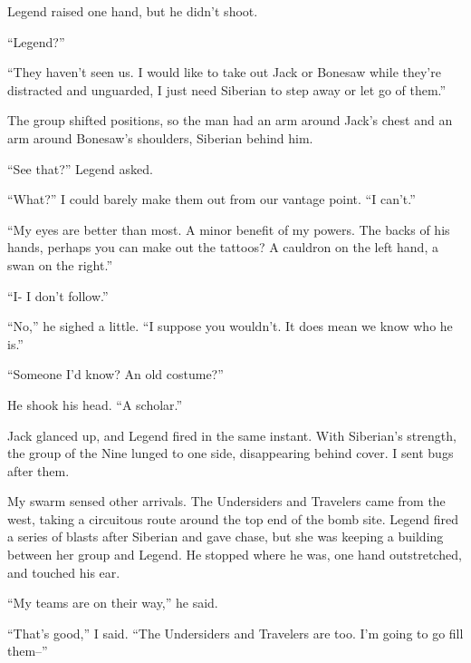 Legend raised one hand, but he didn't shoot.



``Legend?''



``They haven't seen us.  I would like to take out Jack or Bonesaw while they're distracted and unguarded, I just need Siberian to step away or let go of them.''



The group shifted positions, so the man had an arm around Jack's chest and an arm around Bonesaw's shoulders, Siberian behind him.



``See that?'' Legend asked.



``What?''  I could barely make them out from our vantage point.  ``I can't.''



``My eyes are better than most.  A minor benefit of my powers.  The backs of his hands, perhaps you can make out the tattoos?  A cauldron on the left hand, a swan on the right.''



``I- I don't follow.''



``No,'' he sighed a little.  ``I suppose you wouldn't.  It does mean we know who he is.''



``Someone I'd know?  An old costume?''



He shook his head.  ``A scholar.''



Jack glanced up, and Legend fired in the same instant.  With Siberian's strength, the group  of the Nine lunged to one side, disappearing behind cover.  I sent bugs after them.



My swarm sensed other arrivals.  The Undersiders and Travelers came from the west, taking a circuitous route around the top end of the bomb site.  Legend fired a series of blasts after Siberian and gave chase, but she was keeping a building between her group and Legend.   He stopped where he was, one hand outstretched, and touched his ear.



``My teams are on their way,'' he said.



``That's good,'' I said.  ``The Undersiders and Travelers are too.  I'm going to go fill them--''



